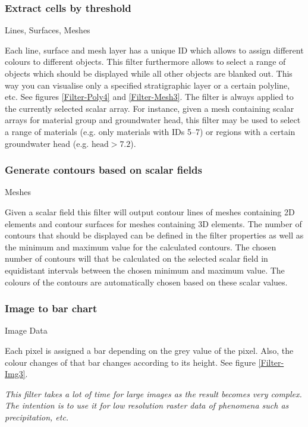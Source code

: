 \subsubsection{Extract cells by threshold}
 Lines, Surfaces, Meshes

 Each line, surface and mesh layer has a unique ID which allows to assign different colours to different objects. This filter furthermore allows to select a range of objects which should be displayed while all other objects are blanked out. This way you can visualise only a specified stratigraphic layer or a certain polyline, etc. See figures \ref{Filter-Poly4} and \ref{Filter-Mesh3}. The filter is always applied to the currently selected scalar array. For instance, given a mesh containing scalar arrays for material group and groundwater head, this filter may be used to select a range of materials (e.g. only materials with IDs 5--7) or regions with a certain groundwater head (e.g. $\text{head}>7.2$).

\subsubsection{Generate contours based on scalar fields}
 Meshes

 Given a scalar field this filter will output contour lines of meshes containing 2D elements and contour surfaces for meshes containing 3D elements. The number of contours that should be displayed can be defined in the filter properties as well as the minimum and maximum value for the calculated contours. The chosen number of contours will that be calculated on the selected scalar field in equidistant intervals between the chosen minimum and maximum value. The colours of the contours are automatically chosen based on these scalar values.

\subsubsection{Image to bar chart}
 Image Data

 Each pixel is assigned a bar depending on the grey value of the pixel. Also, the colour changes of that bar changes according to its height. See figure \ref{Filter-Img3}.

 \emph{This filter takes a lot of time for large images as the result becomes very complex. The intention is to use it for low resolution raster data of phenomena such as precipitation, etc.}

